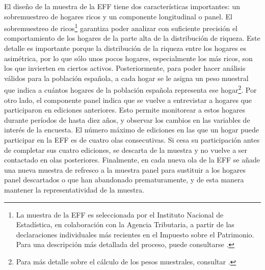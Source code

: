 El diseño de la muestra de la EFF tiene dos características importantes: un sobremuestreo de hogares ricos y un componente longitudinal o panel. El sobremuestreo de ricos\footnote{La muestra de la EFF es seleccionada por el Instituto Nacional de Estadística, en colaboración con la Agencia Tributaria, a partir de las declaraciones individuales más recientes en el Impuesto sobre el Patrimonio. Para una descripción más detallada del proceso, puede consultarse \cite{effmethod2017}.} garantiza poder analizar con suficiente precisión el comportamiento de los hogares de la parte alta de la distribución de riqueza. Este detalle es importante porque la distribución de la riqueza entre los hogares es asimétrica, por lo que sólo unos pocos hogares, especialmente los más ricos, son los que invierten en ciertos activos. Posteriormente, para poder hacer análisis válidos para la población española, a cada hogar se le asigna un peso muestral que indica a cuántos hogares de la población española representa ese hogar\footnote{Para más detalle sobre el cálculo de los pesos muestrales, consultar \cite{effmethod2002}.}. Por otro lado, el componente panel indica que se vuelve a entrevistar a hogares que participaron en ediciones anteriores. Esto permite monitorear a estos hogares durante períodos de hasta diez años, y observar los cambios en las variables de interés de la encuesta. El número máximo de ediciones en las que un hogar puede participar en la EFF es de cuatro olas consecutivas. Si cesa su participación antes de completar sus cuatro ediciones, se descarta de la muestra y no vuelve a ser contactado en olas posteriores. Finalmente, en cada nueva ola de la EFF se añade una nueva muestra de refresco a la muestra panel para sustituir a los hogares panel descartados o que han abandonado prematuramente, y de esta manera mantener la representatividad de la muestra.